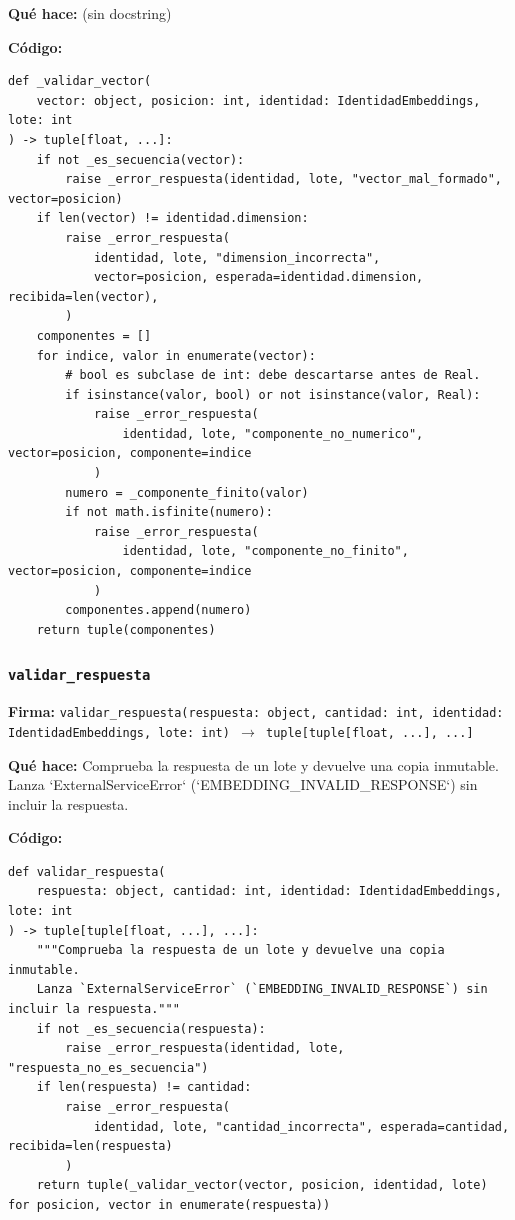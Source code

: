 \documentclass[11pt,a4paper]{article}
\begin{document}
\textbf{Qué hace:} (sin docstring)

\textbf{Código:}
\begin{lstlisting}
def _validar_vector(
    vector: object, posicion: int, identidad: IdentidadEmbeddings, lote: int
) -> tuple[float, ...]:
    if not _es_secuencia(vector):
        raise _error_respuesta(identidad, lote, "vector_mal_formado", vector=posicion)
    if len(vector) != identidad.dimension:
        raise _error_respuesta(
            identidad, lote, "dimension_incorrecta",
            vector=posicion, esperada=identidad.dimension, recibida=len(vector),
        )
    componentes = []
    for indice, valor in enumerate(vector):
        # bool es subclase de int: debe descartarse antes de Real.
        if isinstance(valor, bool) or not isinstance(valor, Real):
            raise _error_respuesta(
                identidad, lote, "componente_no_numerico", vector=posicion, componente=indice
            )
        numero = _componente_finito(valor)
        if not math.isfinite(numero):
            raise _error_respuesta(
                identidad, lote, "componente_no_finito", vector=posicion, componente=indice
            )
        componentes.append(numero)
    return tuple(componentes)
\end{lstlisting}

\subsubsection*{\texttt{validar\_respuesta}}
\textbf{Firma:} \texttt{validar\_respuesta(respuesta: object, cantidad: int, identidad: IdentidadEmbeddings, lote: int) $\rightarrow$ tuple[tuple[float, ...], ...]}

\textbf{Qué hace:} Comprueba la respuesta de un lote y devuelve una copia inmutable.
Lanza `ExternalServiceError` (`EMBEDDING\_INVALID\_RESPONSE`) sin incluir la respuesta.

\textbf{Código:}
\begin{lstlisting}
def validar_respuesta(
    respuesta: object, cantidad: int, identidad: IdentidadEmbeddings, lote: int
) -> tuple[tuple[float, ...], ...]:
    """Comprueba la respuesta de un lote y devuelve una copia inmutable.
    Lanza `ExternalServiceError` (`EMBEDDING_INVALID_RESPONSE`) sin incluir la respuesta."""
    if not _es_secuencia(respuesta):
        raise _error_respuesta(identidad, lote, "respuesta_no_es_secuencia")
    if len(respuesta) != cantidad:
        raise _error_respuesta(
            identidad, lote, "cantidad_incorrecta", esperada=cantidad, recibida=len(respuesta)
        )
    return tuple(_validar_vector(vector, posicion, identidad, lote) for posicion, vector in enumerate(respuesta))
\end{lstlisting}
\end{document}
